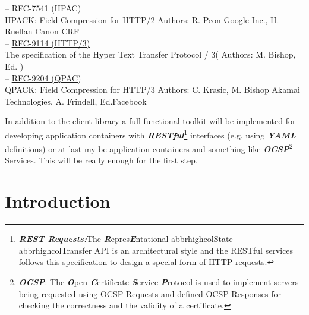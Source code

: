 \documentclass[10pt,a4paper,english]{article}
\newcommand{\abbrhighcol}[1]{\textbf{\textit{#1}}}
\begin{document}
\begin{multicols}{2}
\begin{flushleft}
\hspace*{1em}-- \href{https://www.rfc-editor.org/rfc/pdfrfc/rfc7541.txt.pdf}{RFC-7541 (HPAC)} \\HPACK: Field Compression for HTTP/2 Authors:  R. Peon Google Inc., H. Ruellan Canon CRF\\
\hspace*{1em}-- \href{https://www.rfc-editor.org/rfc/rfc9114.pdf}{RFC-9114 (HTTP/3)} \\The specification of the Hyper Text Transfer Protocol / 3( Authors: M. Bishop, Ed. ) \\
\hspace*{1em}-- \href{https://www.rfc-editor.org/rfc/rfc9204.pdf}{RFC-9204 (QPAC)} \\QPACK: Field Compression for HTTP/3 Authors: C. Krasic, M. Bishop Akamai Technologies,
A. Frindell, Ed.Facebook
\end{flushleft}
\begin{flushleft}
In addition to the client library a full  functional toolkit will be implemented for developing application containers with \abbrhighcol {RESTful}\footnote{\abbrhighcol {REST Requests:}The \abbrhighcol {R}epres\abbrhighcol  {E}ntational abbrhighcol{S}tate abbrhighcol{T}ransfer API is an architectural style and the RESTful services follows this specification to design a special form of HTTP requests.} interfaces (e.g. using \abbrhighcol {YAML} definitions) or at last my be application containers and something like \abbrhighcol {OCSP}\footnote{ \abbrhighcol {OCSP}: The \abbrhighcol  {O}pen \abbrhighcol {C}ertificate \abbrhighcol  {S}ervice \abbrhighcol  {P}rotocol is used to implement servers being requested using OCSP Requests and defined OCSP  Responses for checking the correctness and the validity of a certificate.} Services.
This will be really enough for the first step.
\end{flushleft}

\section{Introduction}


\end{multicols}
\end{document}
